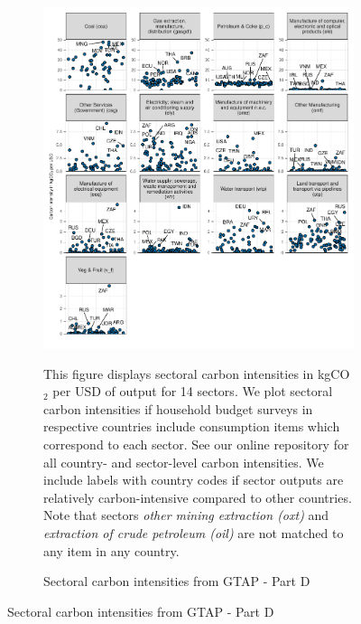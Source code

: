\begin{figure}[ht!]\ContinuedFloat
\begin{subfigure}[b]{\textwidth}
  \centering
  \caption{Sectoral carbon intensities from GTAP - Part D} \label{fig:B4}  \includegraphics{Analysis_Carbon_Intensities_GTAP/Figure_2.1.1_D_2017B}
  \begin{subcaption2}
    This figure displays sectoral carbon intensities in kgCO$_{2}$ per USD of output for 14 sectors. We plot sectoral carbon intensities if household budget surveys in respective countries include consumption items which correspond to each sector. See our online repository for all country- and sector-level carbon intensities. We include labels with country codes if sector outputs are relatively carbon-intensive compared to other countries. Note that sectors \textit{other mining extraction (oxt)} and \textit{extraction of crude petroleum (oil)} are not matched to any item in any country.
  \end{subcaption2}
\end{subfigure}
\end{figure}

\clearpage